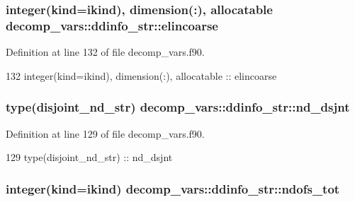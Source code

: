 \subsubsection[{elincoarse}]{\setlength{\rightskip}{0pt plus 5cm}integer(kind=ikind), dimension(\+:), allocatable decomp\+\_\+vars\+::ddinfo\+\_\+str\+::elincoarse\hspace{0.3cm}{\ttfamily [private]}}\label{structdecomp__vars_1_1ddinfo__str_af343f2d75693893cbc522ea40d6a6f27}


Definition at line 132 of file decomp\+\_\+vars.\+f90.


\begin{DoxyCode}
132     \textcolor{keywordtype}{integer(kind=ikind)}, \textcolor{keywordtype}{dimension(:)}, \textcolor{keywordtype}{allocatable} :: elincoarse
\end{DoxyCode}
\subsubsection[{nd\+\_\+dsjnt}]{\setlength{\rightskip}{0pt plus 5cm}type({\bf disjoint\+\_\+nd\+\_\+str}) decomp\+\_\+vars\+::ddinfo\+\_\+str\+::nd\+\_\+dsjnt\hspace{0.3cm}{\ttfamily [private]}}\label{structdecomp__vars_1_1ddinfo__str_ad789da6e101a955fc8b8e2daee580a10}


Definition at line 129 of file decomp\+\_\+vars.\+f90.


\begin{DoxyCode}
129     \textcolor{keywordtype}{type}(disjoint_nd_str) :: nd\_dsjnt
\end{DoxyCode}
\subsubsection[{ndofs\+\_\+tot}]{\setlength{\rightskip}{0pt plus 5cm}integer(kind=ikind) decomp\+\_\+vars\+::ddinfo\+\_\+str\+::ndofs\+\_\+tot\hspace{0.3cm}{\ttfamily [private]}}\label{structdecomp__vars_1_1ddinfo__str_a465faabba80076c5b098ff4eddc7d7c8}


